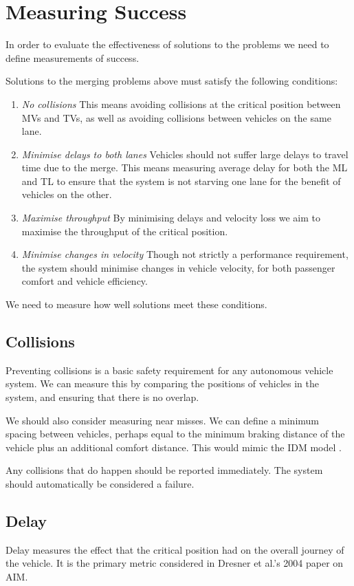 \section{Measuring Success}
\label{sec:Measuring Success}
In order to evaluate the effectiveness of solutions to the problems we need to define measurements of success. 

Solutions to the merging problems above must satisfy the following conditions:

\begin{enumerate}
\item \textit{No collisions}
This means avoiding collisions at the critical position between MVs and TVs, as well as avoiding collisions between vehicles on the same lane.
\item \textit{Minimise delays to both lanes}
Vehicles should not suffer large delays to travel time due to the merge. This means measuring average delay for both the ML and TL to ensure that the system is not starving one lane for the benefit of vehicles on the other.
\item \textit{Maximise throughput}
By minimising delays and velocity loss we aim to maximise the throughput of the critical position.
\item \textit{Minimise changes in velocity}
Though not strictly a performance requirement, the system should minimise changes in vehicle velocity, for both passenger comfort and vehicle efficiency.
\end{enumerate}

We need to measure how well solutions meet these conditions. 

\subsection{Collisions}
\label{subsec:Collisions}
Preventing collisions is a basic safety requirement for any autonomous vehicle system. We can measure this by comparing the positions of vehicles in the system, and ensuring that there is no overlap.

We should also consider measuring near misses. We can define a minimum spacing between vehicles, perhaps equal to the minimum braking distance of the vehicle plus an additional comfort distance. This would mimic the IDM model \citep{Treiber2000}.

Any collisions that do happen should be reported immediately. The system should automatically be considered a failure.

\subsection{Delay}
\label{subsec:Delay}
Delay measures the effect that the critical position had on the overall journey of the vehicle. It is the primary metric considered in Dresner et al.'s 2004 paper \citep{Dresner2004} on AIM.


